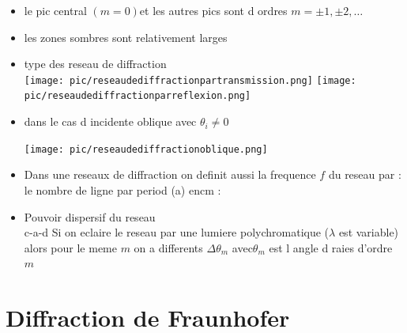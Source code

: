 \documentclass[12pt]{book}
\begin{document}
\begin{itemize}
                \item le pic central $(m=0) $et les autres pics sont d ordres $ m = \pm 1, \pm 2 ,\ldots$
                \item les zones sombres sont relativement larges 
                \item type des reseau de diffraction \\
                    \texttt{[image: pic/reseaudediffractionpartransmission.png]}
                    \texttt{[image: pic/reseaudediffractionparreflexion.png]}
                \item \begin{minipage}{0.49\linewidth}
                    dans le cas d incidente oblique  avec $\theta_i \not = 0$
                \end{minipage}
                \begin{minipage}{0.49\linewidth}
                    \texttt{[image: pic/reseaudediffractionoblique.png]}
                \end{minipage}
                \item Dans une reseaux de diffraction on definit aussi la frequence $f$ du reseau par : le nombre de ligne par period (a) encm  :  
                \item Pouvoir dispersif du reseau  \\ c-a-d Si on eclaire le reseau par une lumiere polychromatique ($\lambda $ est variable) alors pour le meme $m$ on a differents $\Delta\theta_m$ avec$\theta_m$ est l angle d raies d'ordre $m$ 
            \end{itemize}
        \section{Diffraction de Fraunhofer}      
\end{document}
